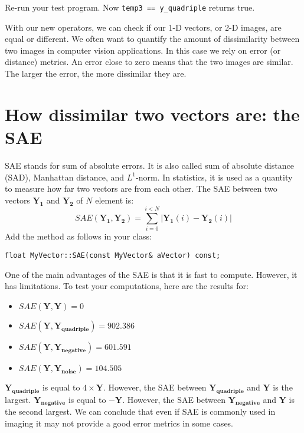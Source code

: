 \documentclass[english,a4paper,12pt,oneside]{article}
\begin{document}
Re-run your test program.
Now \verb+temp3 == y_quadriple+ returns true.


With our new operators, we can check if our 1-D vectors, or 2-D images, are equal or different. We often want to quantify the amount of dissimilarity between two images in computer vision applications. In this case we rely on error (or distance) metrics. An error close to zero means that the two images are similar. The larger the error, the more dissimilar they are.



\section{How dissimilar two vectors are: the SAE}


SAE stands for sum of absolute errors. It is also called sum of absolute distance (SAD), Manhattan distance, and $L^1$-norm.  
In statistics, it is used as a quantity to measure how far two vectors are from each other. 
The SAE between two vectors $\mathbf{Y_1}$ and $\mathbf{Y_2}$ of $N$ element is:
\begin{equation}
SAE(\mathbf{Y_1}, \mathbf{Y_2}) = \sum^{i < N}_{i=0} |\mathbf{Y_1}(i)-\mathbf{Y_2}(i)|
\end{equation}
Add the method as follows in your class:
\begin{lstlisting}
float MyVector::SAE(const MyVector& aVector) const;
\end{lstlisting}

One of the main advantages of the SAE is that it is fast to compute.  
However, it has limitations. 
To test your computations, here are the results for:
\begin{itemize}
\item $SAE(\mathbf{Y}, \mathbf{Y}) =  0$
\item $SAE(\mathbf{Y}, \mathbf{Y_{quadriple}}) =  902.386$
\item $SAE(\mathbf{Y}, \mathbf{Y_{negative}}) =  601.591$
\item $SAE(\mathbf{Y}, \mathbf{Y_{noise}}) =  104.505$
\end{itemize}
$\mathbf{Y_{quadriple}}$ is equal to $4 \times \mathbf{Y}$. 
However, the SAE between $\mathbf{Y_{quadriple}}$ and $\mathbf{Y}$ is the largest. 
$\mathbf{Y_{negative}}$ is equal to $\mathbf{-Y}$. 
However, the SAE between $\mathbf{Y_{negative}}$ and $\mathbf{Y}$ is the second largest. 
We can conclude that even if SAE is commonly used in imaging  it may not provide a good error metrics in some cases.
\end{document}
